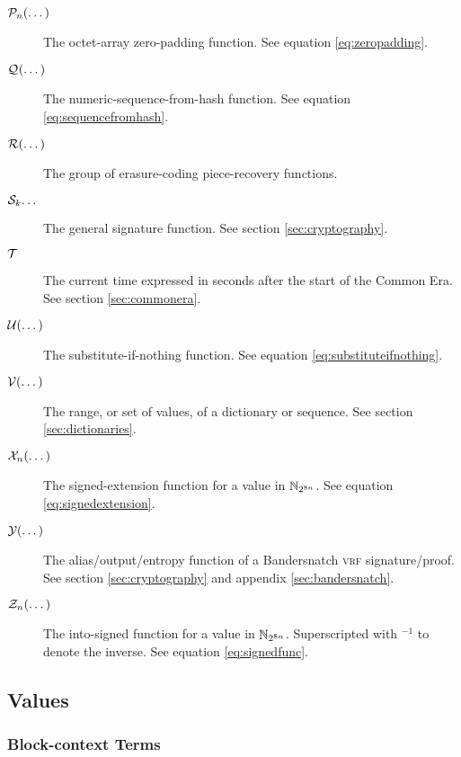 \begin{description}
  \item[$\zeropad{n}{\dots}$] The octet-array zero-padding function. See equation \ref{eq:zeropadding}.
  \item[$\seqfromhash{}{\dots}$] The numeric-sequence-from-hash function. See equation \ref{eq:sequencefromhash}.
  \item[$\ecrecover{\dots}$] The group of erasure-coding piece-recovery functions.
  \item[$\mathcal{S}_{k}{\dots}$] The general signature function. See section \ref{sec:cryptography}.
  \item[$\mathcal{T}$] The current time expressed in seconds after the start of the \Jam Common Era. See section \ref{sec:commonera}.
  \item[$\subifnone{\dots}$] The substitute-if-nothing function. See equation \ref{eq:substituteifnothing}.
  \item[$\values{\dots}$] The range, or set of values, of a dictionary or sequence. See section \ref{sec:dictionaries}.
  \item[$\sext{n}{\dots}$] The signed-extension function for a value in $\mathbb{N}_{2^{8n}}$. See equation \ref{eq:signedextension}.
  \item[$\banderout{\dots}$] The alias/output/entropy function of a Bandersnatch \textsc{vrf} signature/proof. See section \ref{sec:cryptography} and appendix \ref{sec:bandersnatch}.
  \item[$\mathcal{Z}_{n}(\dots)$] The into-signed function for a value in $\mathbb{N}_{2^{8n}}$. Superscripted with ${}^{-1}$ to denote the inverse. See equation \ref{eq:signedfunc}.
\end{description}

\subsection{Values}

\subsubsection{Block-context Terms}

